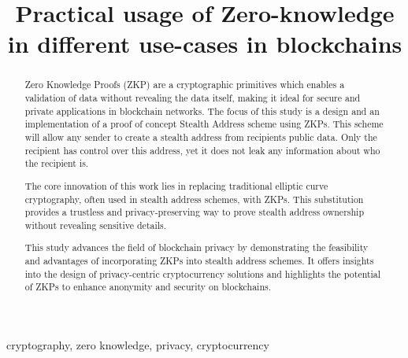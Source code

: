 \documentclass[conference,comsoc,10pt]{IEEEtran}
\begin{document}
\hypersetup{
    colorlinks=true,
    linkcolor=blue,
    urlcolor=cyan,
}

\newcommand{\DOUBLEBLIND}{}   

\title{Practical usage of Zero-knowledge in different use-cases in blockchains} 

\author{
}

\maketitle

\begin{abstract}
    Zero Knowledge Proofs (ZKP) are a cryptographic primitives which enables a
    validation of data without revealing the data itself, making it ideal for
    secure and private applications in blockchain networks. The focus of this
    study is a design and an implementation of a proof of concept Stealth
    Address scheme using ZKPs. This scheme will allow any sender to create a
    stealth address from recipients public data. Only the recipient has control
    over this address, yet it does not leak any information about who the
    recipient is.

    The core innovation of this work lies in replacing traditional elliptic
    curve cryptography, often used in stealth address schemes, with ZKPs. This
    substitution provides a trustless and privacy-preserving way to prove
    stealth address ownership without revealing sensitive details.

    This study advances the field of blockchain privacy by demonstrating the
    feasibility and advantages of incorporating ZKPs into stealth address
    schemes. It offers insights into the design of privacy-centric
    cryptocurrency solutions and highlights the potential of ZKPs to enhance
    anonymity and security on blockchains.

\end{abstract}

\begin{IEEEkeywords}
    cryptography, zero knowledge, privacy, cryptocurrency
\end{IEEEkeywords}
\end{document}
